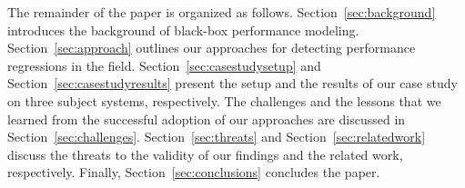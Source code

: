 The remainder of the paper is organized as follows. 
Section~\ref{sec:background} introduces the background of black-box performance modeling.
Section~\ref{sec:approach} outlines our approaches for detecting performance regressions in the field.
Section~\ref{sec:casestudysetup} and Section~\ref{sec:casestudyresults} present the setup and the results of our case study on three subject systems, respectively.
The challenges and the lessons that we learned from the successful adoption of our approaches are discussed in Section~\ref{sec:challenges}.
Section~\ref{sec:threats} and Section~\ref{sec:relatedwork} discuss the threats to the validity of our findings and the related work, respectively.
Finally, Section~\ref{sec:conclusions} concludes the paper.

